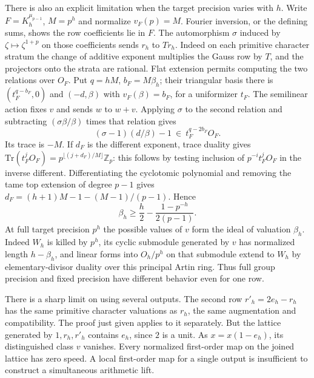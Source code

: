 \documentclass[11pt]{article}
\begin{document}
There is also an explicit limitation when the target precision varies
with $h$. Write $F=K_h^{\mu_{p-1}}$, $M=p^h$ and normalize
$v_F(p)=M$. Fourier inversion, or the defining sums, shows the row
coefficients lie in $F$. The automorphism $\sigma$ induced by
$\zeta\mapsto\zeta^{1+p}$ on those coefficients sends $r_h$ to $T r_h$.
Indeed on each primitive character stratum the change of additive
exponent multiplies the Gauss row by $T$, and the projectors onto
the strata are rational. Flat extension permits computing the two
relations over $O_F$. Put $q=hM$, $b_F=M\beta_h$; their triangular
basis there is $(t_F^{q-b_F},0)$ and $(-d,\beta)$ with
$v_F(\beta)=b_F$, for a uniformizer $t_F$. The semilinear action fixes
$v$ and sends $w$ to $w+v$. Applying $\sigma$ to the second relation
and subtracting $(\sigma\beta/\beta)$ times that relation gives
\[
 (\sigma-1)(d/\beta)-1\ \in\ t_F^{q-2b_F}O_F.
\]
Its trace is $-M$. If $d_F$ is the different exponent, trace duality
gives $\mathrm{Tr}(t_F^jO_F)=p^{\lfloor(j+d_F)/M\rfloor}\mathbb Z_p$:
this follows by testing inclusion of $p^{-i}t_F^jO_F$ in the inverse
different. Differentiating the cyclotomic polynomial and removing
the tame top extension of degree $p-1$ gives
$d_F=(h+1)M-1-(M-1)/(p-1)$. Hence
\[
 \beta_h\ge\frac h2-\frac{1-p^{-h}}{2(p-1)}.
\]
At full target precision $p^h$ the possible values of $v$ form the
ideal of valuation $\beta_h$. Indeed $W_h$ is killed by $p^h$,
its cyclic submodule generated by $v$ has normalized length
$h-\beta_h$, and linear forms into $O_h/p^h$ on that submodule
extend to $W_h$ by elementary-divisor duality over this principal
Artin ring. Thus full group precision and fixed precision have
different behavior even for one row.

There is a sharp limit on using several outputs. The second row
$r'_h=2e_h-r_h$ has the same primitive character valuations as $r_h$,
the same augmentation and compatibility. The proof just given applies
to it separately. But the lattice generated by $1,r_h,r'_h$ contains
$e_h$, since $2$ is a unit. As $x=x(1-e_h)$, its distinguished class
$v$ vanishes. Every normalized first-order map on the joined lattice
has zero speed. A local first-order map for a single output is
insufficient to construct a simultaneous arithmetic lift.
\end{document}
